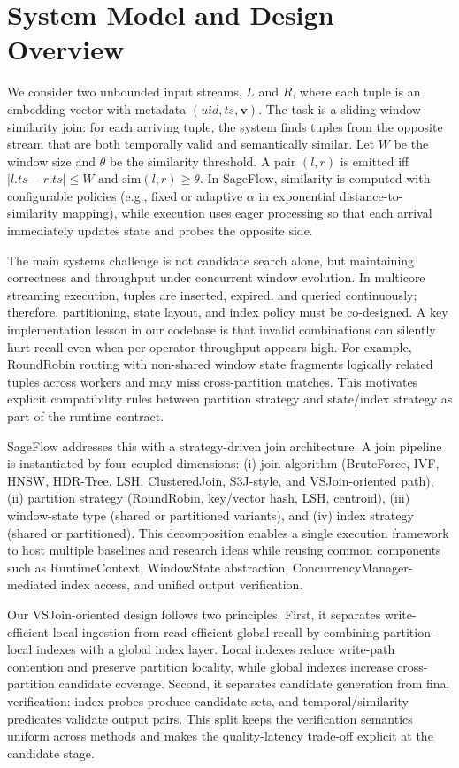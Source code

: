 \section{System Model and Design Overview}
\label{sec:system-model}

We consider two unbounded input streams, $L$ and $R$, where each tuple is an embedding vector with metadata $(\mathit{uid}, \mathit{ts}, \mathbf{v})$. The task is a sliding-window similarity join: for each arriving tuple, the system finds tuples from the opposite stream that are both temporally valid and semantically similar. Let $W$ be the window size and $\theta$ be the similarity threshold. A pair $(l, r)$ is emitted iff $|l.\mathit{ts} - r.\mathit{ts}| \leq W$ and $\mathrm{sim}(l, r) \geq \theta$. In SageFlow, similarity is computed with configurable policies (e.g., fixed or adaptive $\alpha$ in exponential distance-to-similarity mapping), while execution uses eager processing so that each arrival immediately updates state and probes the opposite side.

The main systems challenge is not candidate search alone, but maintaining correctness and throughput under concurrent window evolution. In multicore streaming execution, tuples are inserted, expired, and queried continuously; therefore, partitioning, state layout, and index policy must be co-designed. A key implementation lesson in our codebase is that invalid combinations can silently hurt recall even when per-operator throughput appears high. For example, RoundRobin routing with non-shared window state fragments logically related tuples across workers and may miss cross-partition matches. This motivates explicit compatibility rules between partition strategy and state/index strategy as part of the runtime contract.

SageFlow addresses this with a strategy-driven join architecture. A join pipeline is instantiated by four coupled dimensions: (i) join algorithm (BruteForce, IVF, HNSW, HDR-Tree, LSH, ClusteredJoin, S3J-style, and VSJoin-oriented path), (ii) partition strategy (RoundRobin, key/vector hash, LSH, centroid), (iii) window-state type (shared or partitioned variants), and (iv) index strategy (shared or partitioned). This decomposition enables a single execution framework to host multiple baselines and research ideas while reusing common components such as RuntimeContext, WindowState abstraction, ConcurrencyManager-mediated index access, and unified output verification.

Our VSJoin-oriented design follows two principles. First, it separates write-efficient local ingestion from read-efficient global recall by combining partition-local indexes with a global index layer. Local indexes reduce write-path contention and preserve partition locality, while global indexes increase cross-partition candidate coverage. Second, it separates candidate generation from final verification: index probes produce candidate sets, and temporal/similarity predicates validate output pairs. This split keeps the verification semantics uniform across methods and makes the quality-latency trade-off explicit at the candidate stage.

